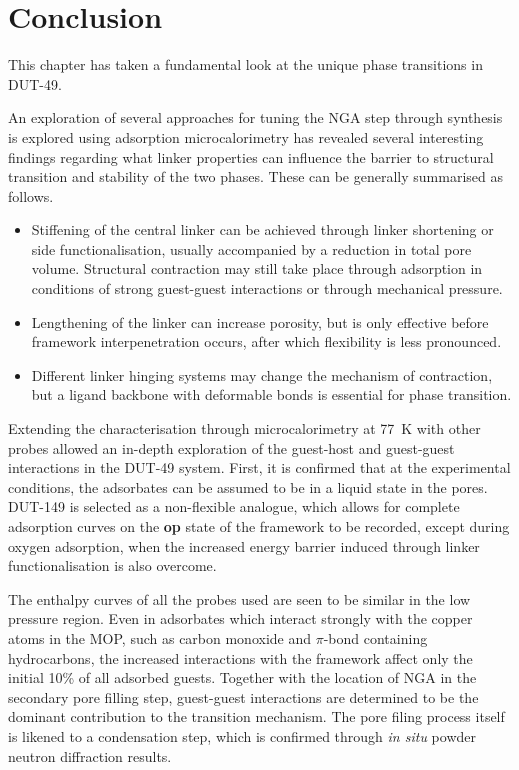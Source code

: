 
\section{Conclusion}

This chapter has taken a fundamental look at the unique phase transitions
in DUT-49.

An exploration of several approaches for tuning the NGA step through 
synthesis is explored using adsorption microcalorimetry has revealed
several interesting findings regarding what linker properties can
influence the barrier to structural transition and stability of the
two phases. These can be generally summarised as follows.

\begin{itemize}
    \item Stiffening of the central linker can be achieved through 
    linker shortening or side functionalisation, usually accompanied 
    by a reduction in total pore volume. Structural contraction may 
    still take place through adsorption in conditions of strong 
    guest-guest interactions or through mechanical pressure.
    \item Lengthening of the linker can increase porosity,
    but is only effective before framework interpenetration 
    occurs, after which flexibility is less pronounced.
    \item Different linker hinging systems may change 
    the mechanism of contraction, but a ligand backbone with 
    deformable bonds is essential for phase transition.
\end{itemize}

Extending the characterisation through microcalorimetry at \SI{77}{\kelvin}
with other probes allowed an in-depth exploration of the guest-host and 
guest-guest interactions in the DUT-49 system. First, it is confirmed 
that at the experimental conditions, the adsorbates can be assumed to 
be in a liquid state in the pores. DUT-149 is selected as a non-flexible 
analogue, which allows for complete adsorption curves on the \textbf{op}
state of the framework to be recorded, except during oxygen adsorption,
when the increased energy barrier induced through linker functionalisation
is also overcome.

The enthalpy curves of all the probes used are seen to 
be similar in the low pressure region. Even in adsorbates which interact 
strongly with the copper atoms in the MOP, such as carbon monoxide and 
\(\pi\)-bond containing hydrocarbons, the increased interactions with the 
framework affect only the initial 10\% of all adsorbed guests. Together
with the location of NGA in the secondary pore filling step,
guest-guest interactions are determined to be the dominant contribution 
to the transition mechanism. The pore filing process itself is likened
to a condensation step, which is confirmed through \textit{in situ}
powder neutron diffraction results.

